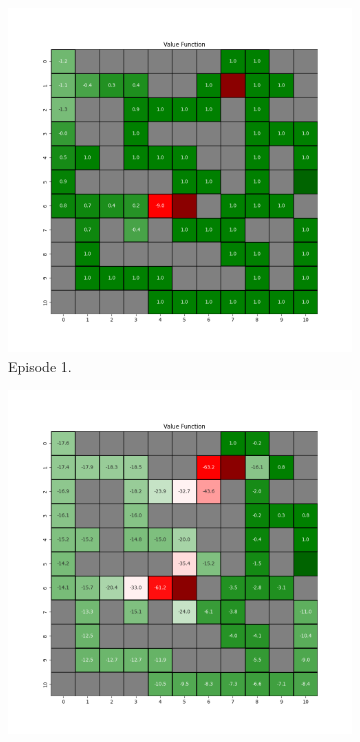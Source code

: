 \documentclass{assignment}
\begin{document}
\begin{figure}[H]
    \begin{subfigure}{0.3\textwidth}
        \includegraphics[width=\textwidth]{figures/value_td/epsilon_sweep/value_function_alpha_0.1_gamma_0.95_epsilon_1.0_iteration_1.png}
    \caption{Episode 1.}
    \end{subfigure}\hfill
    \begin{subfigure}{0.3\textwidth}
        \includegraphics[width=\textwidth]{figures/value_td/epsilon_sweep/value_function_alpha_0.1_gamma_0.95_epsilon_1.0_iteration_50.png}

\end{subfigure}
\end{figure}
\end{document}
